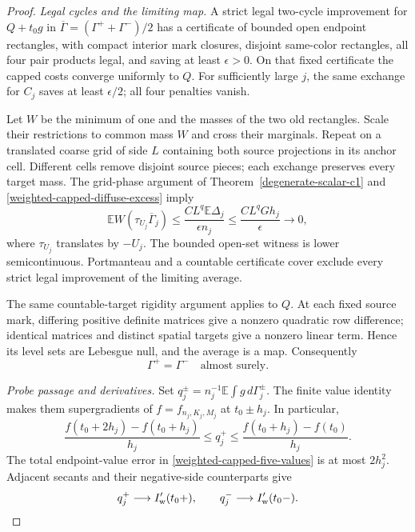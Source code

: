 \documentclass[11pt,reqno]{amsart}
\theoremstyle{definition}
\theoremstyle{remark}
\numberwithin{equation}{section}
\newcommand{\E}{\mathbb E}
\begin{document}
\begin{proof}
\emph{Legal cycles and the limiting map.}
A strict legal two-cycle improvement for \(Q+t_0g\) in
\(\overline\Gamma=(\Gamma^++\Gamma^-)/2\) has a certificate of
bounded open endpoint rectangles, with compact interior mark closures,
disjoint same-color rectangles, all four pair products legal, and
saving at least \(\epsilon>0\). On that fixed certificate the
capped costs converge uniformly to \(Q\). For sufficiently large
\(j\), the same exchange for \(C_j\) saves at least
\(\epsilon/2\); all four penalties vanish.

Let \(W\) be the minimum of one and the masses of the two old
rectangles. Scale their restrictions to common mass \(W\) and cross
their marginals. Repeat on a translated coarse grid of side \(L\)
containing both source projections in its anchor cell. Different cells
remove disjoint source pieces; each exchange preserves every target
mass. The grid-phase argument of Theorem~\ref{degenerate-scalar-c1}
and \eqref{weighted-capped-diffuse-excess} imply
\begin{equation}
\label{weighted-capped-cycle-witness}
 \E W(\tau_{U_j}\overline\Gamma_j)
       \le\frac{C L^q\E\Delta_j}{\epsilon n_j}
       \le\frac{C L^qGh_j}{\epsilon}\longrightarrow0,
\end{equation}
where \(\tau_{U_j}\) translates by \(-U_j\). The bounded open-set
witness is lower semicontinuous. Portmanteau and a countable certificate
cover exclude every strict legal improvement of the limiting average.

The same countable-target rigidity argument applies to \(Q\).
At each fixed source mark, differing positive definite matrices give
a nonzero quadratic row difference; identical matrices and distinct
spatial targets give a nonzero linear term. Hence its level sets are
Lebesgue null, and the average is a map. Consequently
\begin{equation}
\label{weighted-capped-diffuse-agreement}
                         \Gamma^+=\Gamma^-
                         \quad\text{almost surely}.
\end{equation}

\emph{Probe passage and derivatives.}
Set \(q_j^\pm=n_j^{-1}\E\int g\,d\Gamma_j^\pm\). The finite
value identity makes them supergradients of \(f=f_{n_j,K_j,M_j}\)
at \(t_0\pm h_j\). In particular,
\[
 \frac{f(t_0+2h_j)-f(t_0+h_j)}{h_j}
 \le q_j^+\le\frac{f(t_0+h_j)-f(t_0)}{h_j}.
\]
The total endpoint-value error in \eqref{weighted-capped-five-values}
is at most \(2h_j^2\). Adjacent secants and their negative-side
counterparts give
\begin{equation}
\label{weighted-capped-one-sided-derivatives}
 q_j^+\longrightarrow I_{\rm w}'(t_0+),\qquad
 q_j^-\longrightarrow I_{\rm w}'(t_0-).
\end{equation}


\end{proof}
\end{document}
